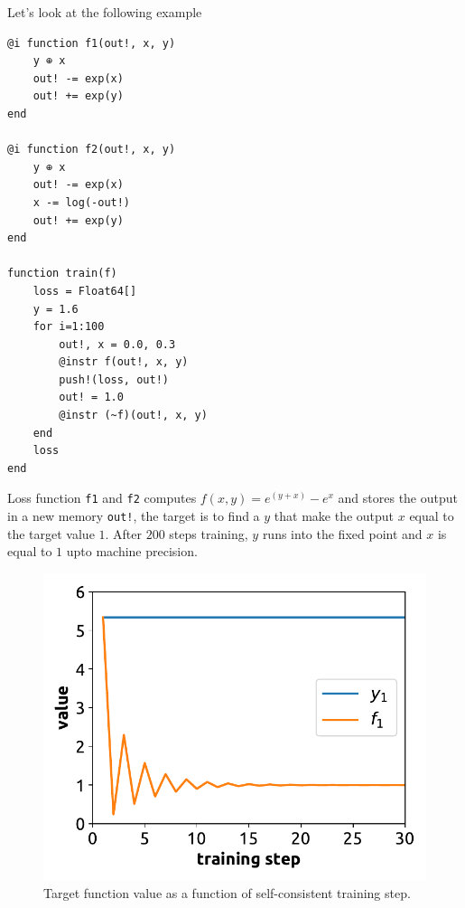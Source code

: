 \documentclass[aps,twocolumn,longbibliography,english,superscriptaddress,prr]{revtex4-1}
\newcommand{\<}{\langle}
\renewcommand{\>}{\rangle}
\begin{document}
Let's look at the following example
\begin{minipage}{.44\textwidth}
\begin{lstlisting}[basicstyle=\small\ttfamily,columns=fullflexible]
@i function f1(out!, x, y)
    y ⊕ x
    out! -= exp(x)
    out! += exp(y)
end

@i function f2(out!, x, y)
    y ⊕ x
    out! -= exp(x)
    x -= log(-out!)
    out! += exp(y)
end

function train(f)
    loss = Float64[]
    y = 1.6
    for i=1:100
        out!, x = 0.0, 0.3
        @instr f(out!, x, y)
        push!(loss, out!)
        out! = 1.0
        @instr (~f)(out!, x, y)
    end
    loss
end
\end{lstlisting}
\end{minipage}

Loss function \texttt{f1} and \texttt{f2} computes $f(x, y) = e^{(y+x)} - e^x$ and stores the output in a new memory \texttt{out!}, the target is to find a $y$ that make the output $x$ equal to the target value $1$.
After $200$ steps training, $y$ runs into the fixed point and $x$ is equal to $1$ upto machine precision.

\begin{figure}
    \centerline{\includegraphics[width=\columnwidth,trim={0 0 0 0},clip]{images/fig1.pdf}}
    \caption{Target function value as a function of self-consistent training step.}\label{fig:invtrain}
\end{figure}
\end{document}
